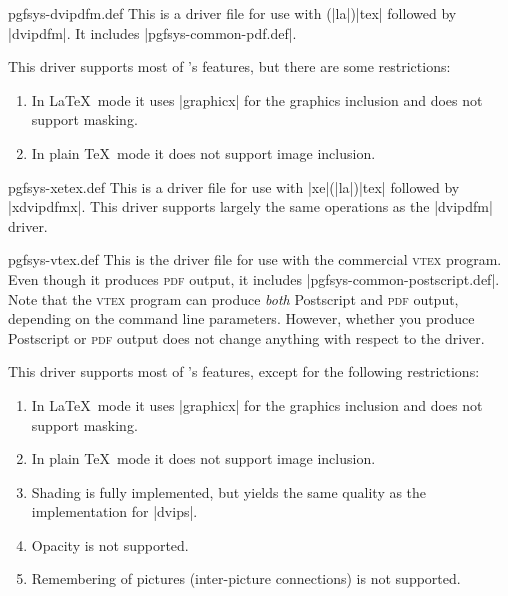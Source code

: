 \begin{filedescription}{pgfsys-dvipdfm.def}
    This is a driver file for use with (|la|)|tex| followed by |dvipdfm|. It
    includes |pgfsys-common-pdf.def|.

    This driver supports most of \pgfname's features, but there are some
    restrictions:
    \begin{enumerate}
        \item In \LaTeX\ mode it uses |graphicx| for the graphics inclusion
            and does not support masking.
        \item In plain \TeX\ mode it does not support image inclusion.
    \end{enumerate}
\end{filedescription}

\begin{filedescription}{pgfsys-xetex.def}
    This is a driver file for use with |xe|(|la|)|tex| followed by |xdvipdfmx|.
    This driver supports largely the same operations as the |dvipdfm| driver.
\end{filedescription}

\begin{filedescription}{pgfsys-vtex.def}
    This is the driver file for use with the commercial \textsc{vtex} program.
    Even though it produces  \textsc{pdf} output, it includes
    |pgfsys-common-postscript.def|. Note that the \textsc{vtex} program can
    produce \emph{both} Postscript and \textsc{pdf} output, depending on the
    command line parameters. However, whether you produce Postscript or
    \textsc{pdf} output does not change anything with respect to the driver.

    This driver supports most of \pgfname's features, except for the following
    restrictions:
    \begin{enumerate}
        \item In \LaTeX\ mode it uses |graphicx| for the graphics inclusion
            and does not support masking.
        \item In plain \TeX\ mode it does not support image inclusion.
        \item Shading is fully implemented, but yields the same quality as
            the implementation for |dvips|.
        \item Opacity is not supported.
        \item Remembering of pictures (inter-picture connections) is not
            supported.
    \end{enumerate}
\end{filedescription}

